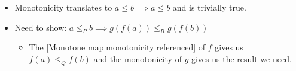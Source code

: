 \begin{itemize}
  \item  Monotonicity translates to $a \leq b \implies a \leq b$ and is trivially true.
  \item Need to show: $a \leq_P b \implies g(f(a)) \leq_R g(f(b))$
      \begin{itemize}
        \item The \ref{Monotone map|monotonicity|referenced} of $f$ gives us $f(a) \leq_Q f(b)$ and the monotonicity of $g$ gives us the result we need.
      \end{itemize}
\end{itemize}